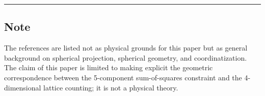 \documentclass[
]{article}
\begin{document}
\begin{center}\rule{0.5\linewidth}{0.5pt}\end{center}

\subsection{Note}\label{note}

The references are listed not as physical grounds for this paper but as
general background on spherical projection, spherical geometry, and
coordinatization. The claim of this paper is limited to making explicit
the geometric correspondence between the 5-component sum-of-squares
constraint and the 4-dimensional lattice counting; it is not a physical
theory.
\end{document}
